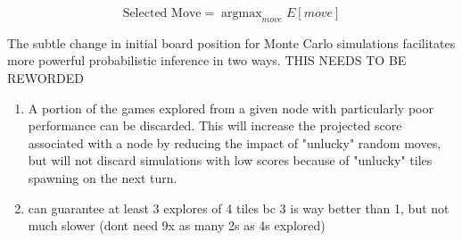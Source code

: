 \documentclass{article}
\DeclareMathOperator*{\argmax}{argmax}
\begin{document}
\begin{equation}
  \textrm{Selected Move} = \argmax_{move} E[move]
\end{equation}

The subtle change in initial board position for Monte Carlo simulations facilitates more powerful probabilistic inference in two ways.  THIS NEEDS TO BE REWORDED




\begin{enumerate}
  \item A portion of the games explored from a given node with particularly poor performance can be discarded.  This will increase the projected score associated with a node by reducing the impact of "unlucky" random moves, but will not discard simulations with low scores because of "unlucky" tiles spawning on the next turn.
  \item can guarantee at least 3 explores of 4 tiles bc 3 is way better than 1, but not much slower (dont need 9x as many 2s as 4s explored)
\end{enumerate}
\end{document}
